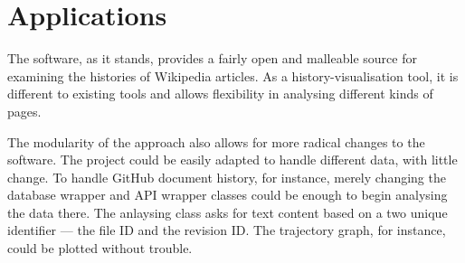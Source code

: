 \section{Applications}
The software, as it stands, provides a fairly open and malleable
source for examining the histories of Wikipedia articles. As a
history-visualisation tool, it is different to existing tools and
allows flexibility in analysing different kinds of pages.

The modularity of the approach also allows for more radical changes to
the software. The project could be easily adapted to handle different
data, with little change. To handle GitHub document history, for
instance, merely changing the database wrapper and API wrapper classes
could be enough to begin analysing the data there. The anlaysing class
asks for text content based on a two unique identifier --- the file ID
and the revision ID. The trajectory graph, for instance, could be
plotted without trouble.
